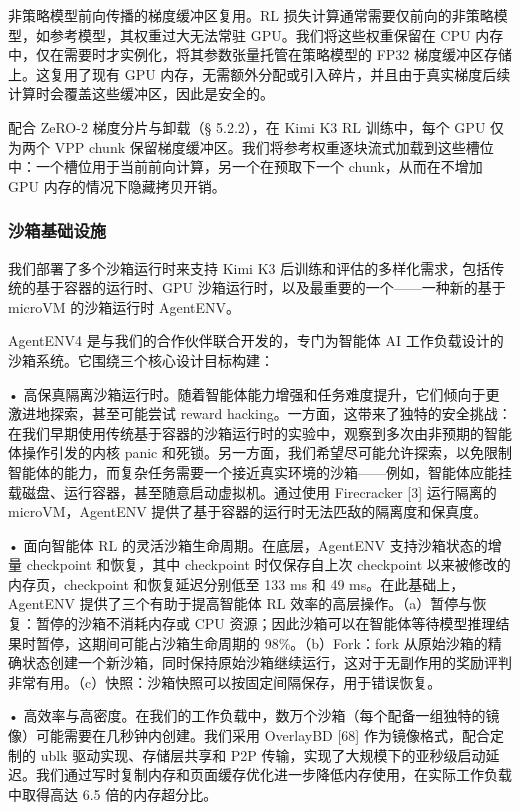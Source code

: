 \documentclass[
  10
]{article}
\begin{document}
非策略模型前向传播的梯度缓冲区复用。RL 损失计算通常需要仅前向的非策略模型，如参考模型，其权重过大无法常驻 GPU。我们将这些权重保留在 CPU 内存中，仅在需要时才实例化，将其参数张量托管在策略模型的 FP32 梯度缓冲区存储上。这复用了现有 GPU 内存，无需额外分配或引入碎片，并且由于真实梯度后续计算时会覆盖这些缓冲区，因此是安全的。

配合 ZeRO-2 梯度分片与卸载（§ 5.2.2），在 Kimi K3 RL 训练中，每个 GPU 仅为两个 VPP chunk 保留梯度缓冲区。我们将参考权重逐块流式加载到这些槽位中：一个槽位用于当前前向计算，另一个在预取下一个 chunk，从而在不增加 GPU 内存的情况下隐藏拷贝开销。

\subsubsection{沙箱基础设施}\label{sandbox-infrastructure}

我们部署了多个沙箱运行时来支持 Kimi K3 后训练和评估的多样化需求，包括传统的基于容器的运行时、GPU 沙箱运行时，以及最重要的一个——一种新的基于 microVM 的沙箱运行时 AgentENV。

AgentENV4 是与我们的合作伙伴联合开发的，专门为智能体 AI 工作负载设计的沙箱系统。它围绕三个核心设计目标构建：

• 高保真隔离沙箱运行时。随着智能体能力增强和任务难度提升，它们倾向于更激进地探索，甚至可能尝试 reward hacking。一方面，这带来了独特的安全挑战：在我们早期使用传统基于容器的沙箱运行时的实验中，观察到多次由非预期的智能体操作引发的内核 panic 和死锁。另一方面，我们希望尽可能允许探索，以免限制智能体的能力，而复杂任务需要一个接近真实环境的沙箱——例如，智能体应能挂载磁盘、运行容器，甚至随意启动虚拟机。通过使用 Firecracker {[}3{]} 运行隔离的 microVM，AgentENV 提供了基于容器的运行时无法匹敌的隔离度和保真度。

• 面向智能体 RL 的灵活沙箱生命周期。在底层，AgentENV 支持沙箱状态的增量 checkpoint 和恢复，其中 checkpoint 时仅保存自上次 checkpoint 以来被修改的内存页，checkpoint 和恢复延迟分别低至 133 ms 和 49 ms。在此基础上，AgentENV 提供了三个有助于提高智能体 RL 效率的高层操作。（a）暂停与恢复：暂停的沙箱不消耗内存或 CPU 资源；因此沙箱可以在智能体等待模型推理结果时暂停，这期间可能占沙箱生命周期的 98\%。（b）Fork：fork 从原始沙箱的精确状态创建一个新沙箱，同时保持原始沙箱继续运行，这对于无副作用的奖励评判非常有用。（c）快照：沙箱快照可以按固定间隔保存，用于错误恢复。

• 高效率与高密度。在我们的工作负载中，数万个沙箱（每个配备一组独特的镜像）可能需要在几秒钟内创建。我们采用 OverlayBD {[}68{]} 作为镜像格式，配合定制的 ublk 驱动实现、存储层共享和 P2P 传输，实现了大规模下的亚秒级启动延迟。我们通过写时复制内存和页面缓存优化进一步降低内存使用，在实际工作负载中取得高达 6.5 倍的内存超分比。
\end{document}
